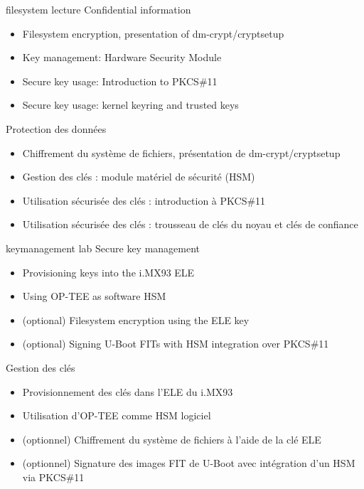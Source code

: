 {filesystem}
{lecture}
{Confidential information}
{
  \begin{itemize}
  \item Filesystem encryption, presentation of dm-crypt/cryptsetup
  \item Key management: Hardware Security Module
  \item Secure key usage: Introduction to PKCS\#11
  \item Secure key usage: kernel keyring and trusted keys
  \end{itemize}
}
{Protection des données}
{
  \begin{itemize}
  \item Chiffrement du système de fichiers, présentation de dm-crypt/cryptsetup
  \item Gestion des clés : module matériel de sécurité (HSM)
  \item Utilisation sécurisée des clés : introduction à PKCS\#11
  \item Utilisation sécurisée des clés : trousseau de clés du noyau et clés de confiance
  \end{itemize}
}

{keymanagement}
{lab}
{Secure key management}
{
  \begin{itemize}
  \item Provisioning keys into the i.MX93 ELE
  \item Using OP-TEE as software HSM
  \item (optional) Filesystem encryption using the ELE key
  \item (optional) Signing U-Boot FITs with HSM integration over PKCS\#11
  \end{itemize}
}
{Gestion des clés}
{
  \begin{itemize}
  \item Provisionnement des clés dans l’ELE du i.MX93
  \item Utilisation d’OP-TEE comme HSM logiciel
  \item (optionnel) Chiffrement du système de fichiers à l’aide de la clé ELE
  \item (optionnel) Signature des images FIT de U-Boot avec intégration d’un HSM via PKCS\#11
  \end{itemize}
}

